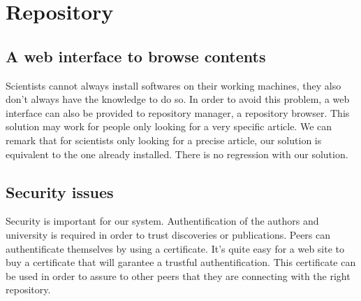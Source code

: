 \section{Repository}

\subsection{A web interface to browse contents}

Scientists cannot always install softwares on their working machines, they also
don't always have the knowledge to do so. In order to avoid this problem, a web interface
can also be provided to repository manager, a repository browser. This solution may work
for people only looking for a very specific article. We can remark that for scientists only
looking for a precise article, our solution is equivalent to the one already installed. There is
no regression with our solution.

\subsection{Security issues}

Security is important for our system. Authentification of the authors and
university is required in order to trust discoveries or publications. Peers
can authentificate themselves by using a certificate. It's quite easy for 
a web site to buy a certificate that will garantee a trustful authentification.
This certificate can be used in order to assure to other peers that they are connecting
with the right repository.
